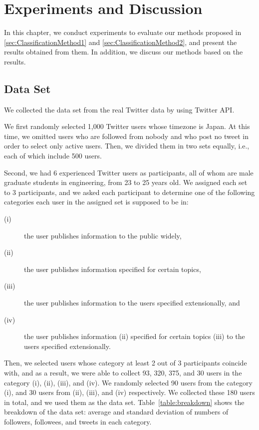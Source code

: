 \section{Experiments and Discussion}
\label{sec:Experiment}

In this chapter, we conduct experiments to evaluate our methods proposed
in \ref{sec:ClassificationMethod1} and \ref{sec:ClassificationMethod2},
and present the results obtained from them.  In addition, we discuss our
methods based on the results.

\subsection{Data Set}
\label{subsec:Data Set}

We collected the data set from the real Twitter data by using Twitter
API.

We first randomly selected 1,000 Twitter users whose timezone is Japan.
At this time, we omitted users who are followed from nobody and who post
no tweet in order to select only active users.  Then, we divided them in
two sets equally, i.e., each of which include 500 users.

Second, we had 6 experienced Twitter users as participants, all of whom
are male graduate students in engineering, from 23 to 25 years old.  We
assigned each set to 3 participants, and we asked each participant to
determine one of the following categories each user in the assigned set
is supposed to be in:

\begin{description}
\item[(i)] the user publishes information to the public widely,
\item[(ii)] the user publishes information specified for certain topics,
\item[(iii)] the user publishes information to the users specified
           extensionally, and
\item[(iv)] the user publishes information (ii) specified for certain
           topics (iii) to the users specified extensionally.
\end{description}


Then, we selected users whose category at least 2 out of 3 participants
coincide with, and as a result, we were able to collect 93, 320, 375,
and 30 users in the category (i), (ii), (iii), and (iv).  We randomly
selected 90 users from the category (i), and 30 users from (ii), (iii),
and (iv) respectively.  We collected these 180 users in total, and we
used them as the data set.  Table~\ref{table:breakdown} shows the
breakdown of the data set: average and standard deviation of numbers of
followers,  followees, and tweets in each category.

